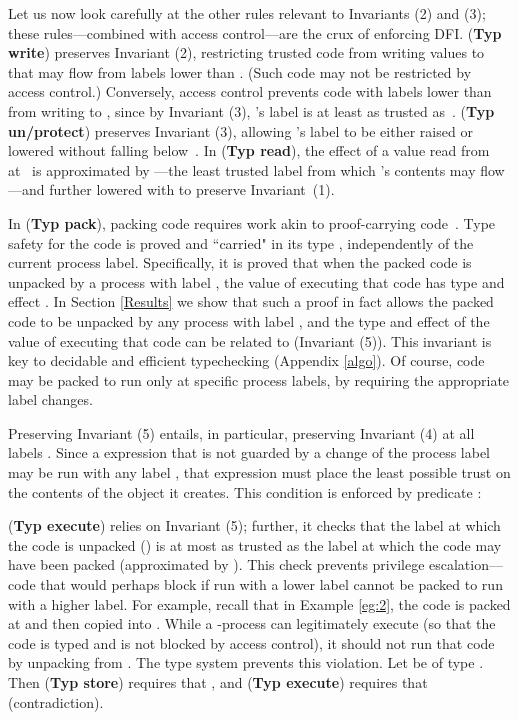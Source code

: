 \documentclass{sigplanconf}
\newcommand{\trule}[1]{(\textbf{Typ #1})}
\begin{document}
Let us now look carefully at the other rules relevant to Invariants (2) and (3); these rules---combined with access control---are the crux of enforcing DFI. 
\trule{write} preserves Invariant (2), restricting trusted code from writing values to  that may flow from labels lower than . (Such code may not be restricted by access control.) Conversely, access control prevents code with labels lower than  from writing to , since by Invariant (3), 's label is at least as trusted as~. 
\trule{un/protect} preserves Invariant (3), allowing 's label to be either raised or lowered without falling below~. 
In \trule{read}, the effect of a value read from  at~ is approximated by ---the least trusted
label from which 's contents may flow---and further lowered with  to preserve Invariant~(1). 


In \trule{pack}, packing code requires work akin to proof-carrying
code~\cite{pcc}. Type safety for the code is proved and ``carried" in its type
, independently of the current process label. Specifically, it is proved that when the packed code
is unpacked by a process with label , the value of executing that code has type and effect . In Section \ref{Results} we show that such a proof in fact allows the packed code
to be unpacked by any process with label , and the type and effect of the value of executing that code can be related to  (Invariant (5)). 
This invariant is key to decidable and efficient typechecking (Appendix \ref{algo}). Of course, code may be packed to run only at specific process labels, by requiring the appropriate label changes.

Preserving Invariant (5) entails, in particular, preserving Invariant (4) at all labels . Since a  expression that is not guarded by a change of the process label may be run with any label , that expression must place the least possible trust on the contents of the object it creates. This condition is enforced  by predicate  :

\trule{execute} relies on Invariant (5); further, it checks that the label at which the code is unpacked () is at most as trusted as the label at which the code may have been packed (approximated by ). This check prevents privilege escalation---code that would perhaps block if run with a lower label cannot be packed to run with a higher label. For example, recall that in Example \ref{eg:2}, the code 
is packed at  and then copied into . While a -process can legitimately execute  (so that the code is typed and is not blocked by access control), it should not run that code by unpacking  from . The type system prevents this violation. Let  be of type . Then \trule{store} requires that , and \trule{execute} requires that  (contradiction). 
\end{document}
